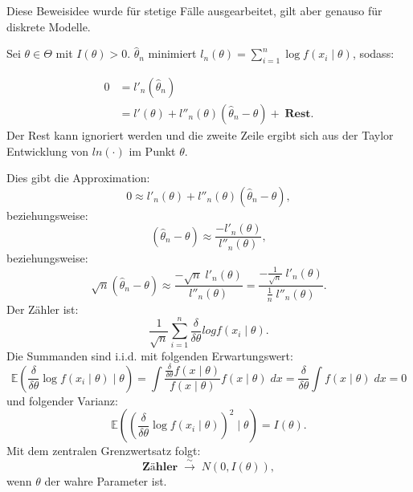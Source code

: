 \documentclass[10pt]{article}
\newcommand{\EW}{\mathbb{E}} %
\newcommand{\KV}{\overset{\sim} \longrightarrow} %
\newcommand{\xt}{x \mid \theta} %
\newcommand{\ablt}{\frac{\delta}{\delta \theta}}
\newenvironment{BWS}[1][]
{\begin{Beweis}[frametitle=#1]}{\end{Beweis}}
\begin{document}
	\begin{BWS}[Beweisidee Verteilung des Schätzfehlers]
		Diese Beweisidee wurde für stetige Fälle ausgearbeitet, gilt aber genauso für diskrete Modelle. 
		
		Sei $\theta \in \Theta$ mit $I(\theta) > 0$. $\hat{\theta}_n$ minimiert $l_n (\theta) = \sum_{i=1}^{n} \log f (x_i \mid \theta)$, sodass:
		
		\begin{equation*}
			\begin{split}
				0 &= l'_n (\hat{\theta}_n) \\
				&= l'(\theta) + l''_n(\theta) (\hat{\theta}_n - \theta) + \; \textbf{Rest}.
			\end{split}
		\end{equation*}
		Der Rest kann ignoriert werden und die zweite Zeile ergibt sich aus der Taylor Entwicklung von $ln(\cdot)$ im Punkt $\theta$. 
		
		Dies gibt die Approximation:
		\begin{equation*}
			0 \approx l'_n (\theta) +  l''_n(\theta) (\hat{\theta}_n - \theta),
		\end{equation*}
		beziehungsweise:
		\begin{equation*}
			(\hat{\theta}_n - \theta) \approx \frac{-l'_n (\theta)}{l''_n(\theta)},
		\end{equation*}
		beziehungsweise:
		\begin{equation*}
			\sqrt{n} (\hat{\theta}_n - \theta) \approx \frac{-\sqrt{n}\;l'_n(\theta)}{l''_n(\theta)} = \frac{-\frac{1}{\sqrt{n} } \; l'_n(\theta)}{\frac{1}{n}\;l''_n(\theta)}.
		\end{equation*}
		Der Zähler ist:
		\begin{equation*}
			\frac{1}{\sqrt{n}}\sum_{i=1}^{n} \frac{\delta}{\delta \theta} log f(x_i \mid \theta).
		\end{equation*}
		Die Summanden sind i.i.d. mit folgenden Erwartungswert:
		\begin{equation*}
			\EW\left(\ablt \log f(x_i \mid \theta) \mid \theta\right) = \int \frac{\ablt f(x \mid \theta)}{f(\xt)} f(\xt) \; dx = \ablt \int f(\xt) \; dx = 0
		\end{equation*}
		und folgender Varianz:
		\begin{equation*}
			\EW(\left(\ablt \log f(x_i \mid \theta)\right)^2 \mid \theta) = I(\theta).
		\end{equation*}
		Mit dem zentralen Grenzwertsatz folgt:
		\begin{equation*}
			\textbf{Zähler} \; \KV \; N(0,I(\theta)),
		\end{equation*}
		wenn $\theta$ der wahre Parameter ist.
		

\end{BWS}
\end{document}
